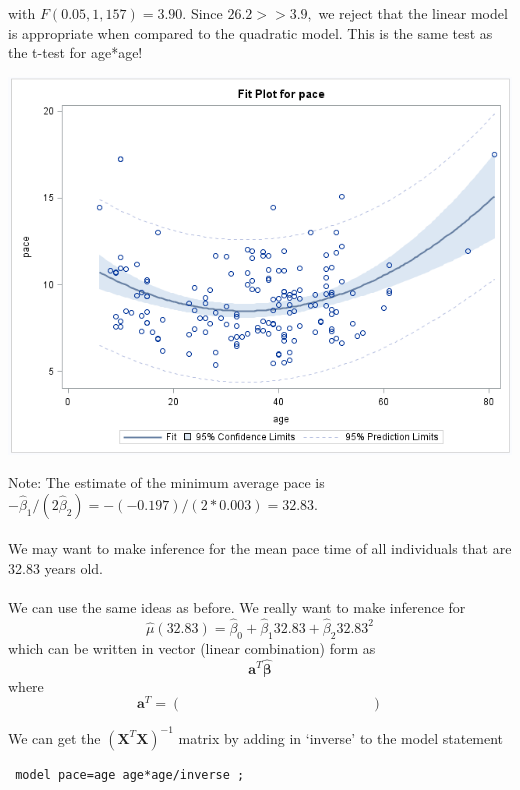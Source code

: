 with $F(0.05,1,157)=3.90$.  Since $26.2 > > 3.9,$ we reject that the linear model is appropriate when compared to the quadratic model.  This is the same test as the t-test for age*age!

\begin{flushleft}
\includegraphics[scale=0.7]{resrunquadraticplot}
\end{flushleft}

\newpage


Note: The estimate of the minimum average pace is $-\hat{\beta}_1/(2\hat{\beta}_2)=-(-0.197)/(2*0.003)=32.83$.  \\~\\

We may want to make inference for the mean pace time of all individuals that are 32.83 years old.\\~\\

We can use the same ideas as before.  We really want to make inference for 
$$\hat{\mu}(32.83)=\hat{\beta}_0+\hat{\beta}_{1}32.83+\hat{\beta}_{2}32.83^2$$
which can be written in vector (linear combination) form as
$$\textbf{a}^{T}\boldsymbol{\hat{\beta}}$$ 
where 
$$\textbf{a}^{T}=(~~~~~~~~~~~~~~~~~~~~~~~~~~~~~~~~~~~~~~~~~~~~~~~~~~~~~~~~~~~~~)$$

We can get the $\left(\textbf{X}^{T}\textbf{X}\right)^{-1}$ matrix by adding in `inverse' to the model statement
\begin{small}
\begin{verbatim}
 model pace=age age*age/inverse ; 
\end{verbatim}
\end{small}

